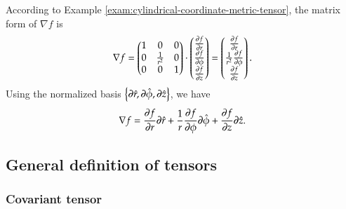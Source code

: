 \documentclass[11pt, a4paper]{book}
\begin{document}
\begin{Example}
  According to Example \ref{exam:cylindrical-coordinate-metric-tensor}, the matrix form of
  $\nabla f$ is
  \begin{equation}
    \nabla f = \begin{pmatrix}
      1 & 0 & 0 \\
      0 & \frac{1}{r^2} & 0\\
      0 & 0 & 1
    \end{pmatrix} \cdot \begin{pmatrix}
      \frac{\partial f}{\partial r} \\
      \frac{\partial f}{\partial \phi} \\
      \frac{\partial f}{\partial z}
    \end{pmatrix} = \begin{pmatrix}
      \frac{\partial f}{\partial r} \\
      \frac{1}{r^2}\frac{\partial f}{\partial \phi} \\
      \frac{\partial f}{\partial z}
    \end{pmatrix}.
  \end{equation}
  Using the normalized basis $\left\{ \boldsymbol{\partial}\hat{r}, \boldsymbol{\partial}\hat{\phi},
    \boldsymbol{\partial}\hat{z} \right\}$, we have
  \begin{equation}
    \nabla f = \frac{\partial f}{\partial r} \boldsymbol{\partial}\hat{r} + \frac{1}{r} \frac{\partial
      f}{\partial \phi} \boldsymbol{\partial}\hat{\phi} + \frac{\partial f}{\partial z} \boldsymbol{\partial}\hat{z}.
  \end{equation}
\end{Example}

\subsection{General definition of tensors}

\subsubsection{Covariant tensor}
\label{sec:covariant-tensor}
\end{document}
